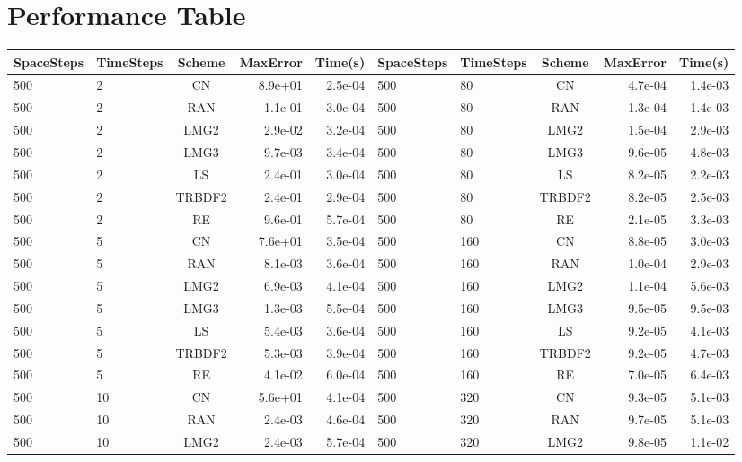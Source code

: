 \documentclass[]{rAMF2e}
\begin{document}
\section{Performance Table}
\begin{table}[h]
\begin{center}
\begin{tiny}
\begin{tabular}{|l|l|c|r|r||l|l|c|r|r|}
\hline
SpaceSteps & TimeSteps & Scheme & MaxError & Time(s) & SpaceSteps & TimeSteps & Scheme & MaxError & Time(s)\\ \hline
500 & 2 & CN & 8.9e+01 & 2.5e-04        & 500 & 80 & CN & 4.7e-04 & 1.4e-03\\
500 & 2 & RAN & 1.1e-01 & 3.0e-04 &       500 & 80 & RAN & 1.3e-04 & 1.4e-03\\
500 & 2 & LMG2 & 2.9e-02 & 3.2e-04 &      500 & 80 & LMG2 & 1.5e-04 & 2.9e-03\\
500 & 2 & LMG3 & 9.7e-03 & 3.4e-04 &      500 & 80 & LMG3 & 9.6e-05 & 4.8e-03\\
500 & 2 & LS & 2.4e-01 & 3.0e-04 &        500 & 80 & LS & 8.2e-05 & 2.2e-03\\
500 & 2 & TRBDF2 & 2.4e-01 & 2.9e-04 &    500 & 80 & TRBDF2 & 8.2e-05 & 2.5e-03\\
500 & 2 & RE & 9.6e-01 & 5.7e-04 &        500 & 80 & RE & 2.1e-05 & 3.3e-03\\
500 & 5 & CN & 7.6e+01 & 3.5e-04 &        500 & 160 & CN & 8.8e-05 & 3.0e-03\\
500 & 5 & RAN & 8.1e-03 & 3.6e-04 &       500 & 160 & RAN & 1.0e-04 & 2.9e-03\\
500 & 5 & LMG2 & 6.9e-03 & 4.1e-04 &      500 & 160 & LMG2 & 1.1e-04 & 5.6e-03\\
500 & 5 & LMG3 & 1.3e-03 & 5.5e-04 &      500 & 160 & LMG3 & 9.5e-05 & 9.5e-03\\
500 & 5 & LS & 5.4e-03 & 3.6e-04 &        500 & 160 & LS & 9.2e-05 & 4.1e-03\\
500 & 5 & TRBDF2 & 5.3e-03 & 3.9e-04&     500 & 160 & TRBDF2 & 9.2e-05 & 4.7e-03\\
500 & 5 & RE & 4.1e-02 & 6.0e-04 &        500 & 160 & RE & 7.0e-05 & 6.4e-03\\
500 & 10 & CN & 5.6e+01 & 4.1e-04 &       500 & 320 & CN & 9.3e-05 & 5.1e-03\\
500 & 10 & RAN & 2.4e-03 & 4.6e-04&       500 & 320 & RAN & 9.7e-05 & 5.1e-03\\
500 & 10 & LMG2 & 2.4e-03 & 5.7e-04&      500 & 320 & LMG2 & 9.8e-05 & 1.1e-02\\

\end{tabular}
\end{tiny}
\end{center}
\end{table}
\end{document}
